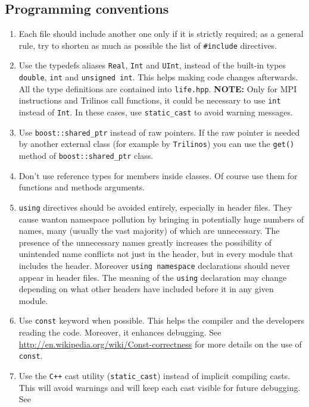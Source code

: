 \documentclass[a4paper]{article}
\begin{document}
\subsection{Programming conventions}
\begin{enumerate}
  \item Each file should include another one only if it is strictly required; as a general rule, try to shorten as much as possible the list of \texttt{\#include} directives.
  \item Use the typedefs aliases \texttt{Real}, \texttt{Int} and \texttt{UInt}, instead of the built-in types \texttt{double}, \texttt{int} and \texttt{unsigned int}. This helps making code changes afterwards. All the type definitions are contained into \texttt{life.hpp}. \newline \textbf{NOTE:} Only for MPI instructions and Trilinos call functions, it could be necessary to use \texttt{int} instead of \texttt{Int}. In these cases, use \texttt{static\_cast} to avoid warning messages.
  \item Use \texttt{boost::shared\_ptr} instead of raw pointers. If the raw pointer is needed by another external class (for example by \texttt{Trilinos}) you can use the \texttt{get()} method of \texttt{boost::shared\_ptr} class.
  \item Don't use reference types for members inside classes. Of course use them for functions and methods arguments.
  \item \texttt{using} directives should be avoided entirely, especially in header files. They cause wanton namespace pollution by bringing in potentially huge numbers of names, many (usually the vast majority) of which are unnecessary. The presence of the unnecessary names greatly increases the possibility of unintended name conflicts not just in the header, but in every module that includes the header. Moreover
  \texttt{using namespace} declarations should never appear in header files. The meaning of the \texttt{using} declaration may change depending on what other headers have included before it in any given module.
  \item Use \texttt{const} keyword when possible. This helps the compiler and the developers reading the code. Moreover, it enhances debugging. See \url{http://en.wikipedia.org/wiki/Const-correctness} for more details on the use of \texttt{const}.
  \item Use the \texttt{C++} cast utility (\texttt{static\_cast}) instead of implicit compiling casts. This will avoid warnings and will keep each cast visible for future debugging. See

\end{enumerate}
\end{document}
